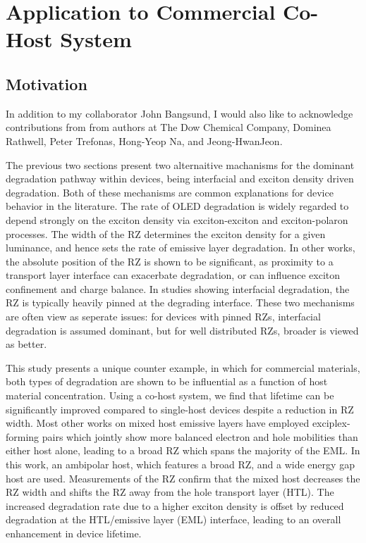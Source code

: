 \documentclass[../thesis.tex]{subfiles}
\begin{document}
\newpage


\section{Application to Commercial Co-Host System}\label{sec:lifetime_dow}
\subsection{Motivation}

In addition to my collaborator John Bangsund, I would also like to acknowledge contributions from from authors at The Dow Chemical Company, Dominea Rathwell, Peter Trefonas, Hong-Yeop Na, and Jeong-HwanJeon.

The previous two sections present two alternaitive machanisms for the dominant degradation pathway within devices, being interfacial and exciton density driven degradation.
Both of these mechanisms are common explanations for device behavior in the literature.
The rate of OLED degradation is widely regarded to depend strongly on the exciton density via exciton-exciton and exciton-polaron processes.\supercite{Scholz2015,Schmidbauer2013a,Giebink2008a,Bangsund2018,Liu2004,So2010} 
The width of the RZ determines the exciton density for a given luminance, and hence sets the rate of emissive layer degradation.\supercite{Bangsund2018,Zhang2014,Chwang2002,Wu2016} 
In other works, the absolute position of the RZ is shown to be significant, as proximity to a transport layer interface can exacerbate degradation,\supercite{Hershey2017,Wang2013,Jeon2015} or can influence exciton confinement and charge balance.\supercite{Coburn2017,Coburn2016a} 
In studies showing interfacial degradation, the RZ is typically heavily pinned at the degrading interface. 
These two mechanisms are often view as seperate issues: for devices with pinned RZs, interfacial degradation is assumed dominant, but for well distributed RZs, broader is viewed as better.


This study presents a unique counter example, in which for commercial materials, both types of degradation are shown to be influential as a function of host material concentration.
Using a co-host system, we find that lifetime can be significantly improved compared to single-host devices despite a reduction in RZ width. 
Most other works on mixed host emissive layers have employed exciplex-forming pairs which jointly show more balanced electron and hole mobilities than either host alone, leading to a broad RZ which spans the majority of the EML.\supercite{Kim2017,Kim2017,Chwang2002,Erickson2011,Song2017}
In this work, an ambipolar host, which features a broad RZ, and a wide energy gap host are used. 
Measurements of the RZ confirm that the mixed host decreases the RZ width and shifts the RZ away from the hole transport layer (HTL). 
The increased degradation rate due to a higher exciton density is offset by reduced degradation at the HTL/emissive layer (EML) interface, leading to an overall enhancement in device lifetime. 
\end{document}
